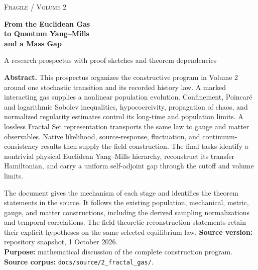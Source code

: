 \documentclass[11pt,a4paper]{article}
\begin{document}
\hypersetup{pageanchor=false}
\begin{titlepage}
\vspace*{18mm}
{\small\scshape Fragile / Volume 2}\par\vspace{12mm}
{\LARGE\bfseries\color{ink} From the Euclidean Gas\\[4pt] to Quantum Yang--Mills\\[4pt] and a Mass Gap}\par\vspace{8mm}
{\large A research prospectus with proof sketches and theorem dependencies}\par\vspace{13mm}
\textbf{Abstract.} This prospectus organizes the constructive program in Volume 2 around one stochastic transition and its recorded history law. A marked interacting gas supplies a nonlinear population evolution. Confinement, Poincar\'e and logarithmic Sobolev inequalities, hypocoercivity, propagation of chaos, and normalized regularity estimates control its long-time and population limits. A lossless Fractal Set representation transports the same law to gauge and matter observables. Native likelihood, source-response, fluctuation, and continuum-consistency results then supply the field construction. The final tasks identify a nontrivial physical Euclidean Yang--Mills hierarchy, reconstruct its transfer Hamiltonian, and carry a uniform self-adjoint gap through the cutoff and volume limits.

The document gives the mechanism of each stage and identifies the theorem statements in the source. It follows the existing population, mechanical, metric, gauge, and matter constructions, including the derived sampling normalizations and temporal correlations. The field-theoretic reconstruction statements retain their explicit hypotheses on the same selected equilibrium law.
\vfill
\textbf{Source version:} repository snapshot, 1 October 2026.\\
\textbf{Purpose:} mathematical discussion of the complete construction program.\\
\textbf{Source corpus:} \texttt{docs/source/2\_fractal\_gas/}.
\end{titlepage}
\hypersetup{pageanchor=true}
\begingroup\setlength{\parskip}{0pt}\small\tableofcontents\endgroup
\clearpage
{}
\end{document}
